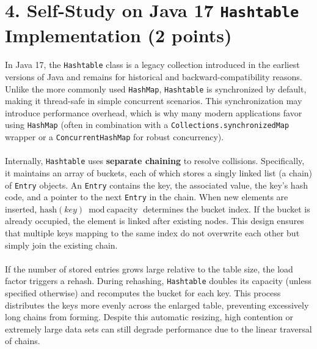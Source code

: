 \documentclass[12pt]{article}
\begin{document}
	\section*{4. Self-Study on Java 17 \texttt{Hashtable} Implementation (2 points)}
	
	\paragraph{}In Java 17, the \texttt{Hashtable} class is a legacy collection introduced in the earliest versions of Java and remains for historical and backward-compatibility reasons. Unlike the more commonly used \texttt{HashMap}, \texttt{Hashtable} is synchronized by default, making it thread-safe in simple concurrent scenarios. This synchronization may introduce performance overhead, which is why many modern applications favor using \texttt{HashMap} (often in combination with a \texttt{Collections.synchronizedMap} wrapper or a \texttt{ConcurrentHashMap} for robust concurrency).
	
	\paragraph{}Internally, \texttt{Hashtable} uses \textbf{separate chaining} to resolve collisions. Specifically, it maintains an array of buckets, each of which stores a singly linked list (a chain) of \texttt{Entry} objects. An \texttt{Entry} contains the key, the associated value, the key’s hash code, and a pointer to the next \texttt{Entry} in the chain. When new elements are inserted, \(\text{hash}(key) \bmod \text{capacity}\) determines the bucket index. If the bucket is already occupied, the element is linked after existing nodes. This design ensures that multiple keys mapping to the same index do not overwrite each other but simply join the existing chain.
	
	\paragraph{}If the number of stored entries grows large relative to the table size, the load factor triggers a rehash. During rehashing, \texttt{Hashtable} doubles its capacity (unless specified otherwise) and recomputes the bucket for each key. This process distributes the keys more evenly across the enlarged table, preventing excessively long chains from forming. Despite this automatic resizing, high contention or extremely large data sets can still degrade performance due to the linear traversal of chains.
	
\end{document}
